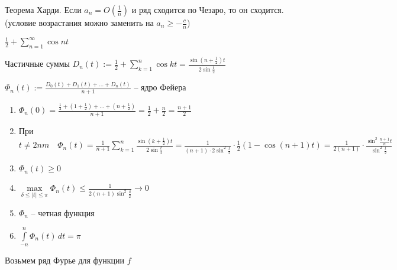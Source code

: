 \begin{remark}\thmslashn

	Теорема Харди. Если $a_n = O(\frac{1}{n})$ и ряд сходится по Чезаро, то он сходится. (условие возрастания можно заменить на $a_n \geqslant - \frac{c}{n}$)

\end{remark}

\begin{example}\thmslashn
	
	$\frac{1}{2} + \sum\limits_{n = 1}^{\infty} \cos nt$
	
	Частичные суммы $D_n(t) := \frac{1}{2} + \sum\limits_{k = 1}^n \cos kt = \frac{\sin\left(n+\frac{1}{2}\right) t}{2 \sin \frac{t}{2}}$
	
	$\Phi_n(t) := \frac{D_0(t) + D_1(t) + \ldots + D_n(t)}{n+1}$ -- ядро Фейера
	
\end{example}

\begin{consequence}\thmslashn
	
	\begin{enumerate}
		\item 
		$\Phi_n(0) = \frac{\frac{1}{2} + \left(1 + \frac{1}{2}\right) + \ldots + \left(n + \frac{1}{2}\right)}{n+1} = \frac{1}{2} + \frac{n}{2} = \frac{n+1}{2}$
		
		\item
		При $t \not = 2nm \quad \Phi_n(t) = \frac{1}{n+1}\sum\limits_{k = 1}^{n}\frac{\sin(k + \frac{1}{2})t}{2 \sin \frac{t}{2}} = \frac{1}{(n+1)\cdot 2 \sin^2\frac{t}{2}} \cdot \frac{1}{2}(1 - \cos(n+1)t) = \frac{1}{2(n+1)}\cdot \frac{\sin^2 \frac{n+1}{n}t}{\sin^2 \frac{t}{2}}$
		
		\item
		$\Phi_n(t) \geqslant 0$
		
		\item
		$\max\limits_{\delta \leqslant |t| \leqslant \pi} \Phi_n(t) \leqslant \frac{1}{2(n+1) \sin^2\frac{\delta}{2}} \to 0$
		
		\item
		$\Phi_n$ -- четная функция
		
		\item
		$\int\limits_{-n}^n \Phi_n(t)\,dt = \pi$
		
	\end{enumerate}
	
\end{consequence}

Возьмем ряд Фурье для функции $f$

